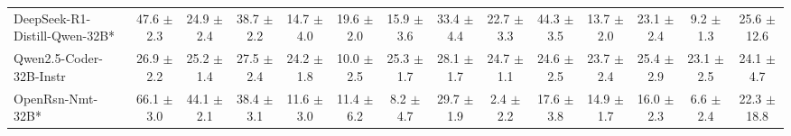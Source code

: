 \begin{table}[hbt]
{\begin{tabular}{l *{13}{c}}
DeepSeek-R1-Distill-Qwen-32B* &
47.6 {\tiny$\pm$ 2.3} &
24.9 {\tiny$\pm$ 2.4} &
38.7 {\tiny$\pm$ 2.2} &
14.7 {\tiny$\pm$ 4.0} &
19.6 {\tiny$\pm$ 2.0} &
15.9 {\tiny$\pm$ 3.6} &
33.4 {\tiny$\pm$ 4.4} &
22.7 {\tiny$\pm$ 3.3} &
44.3 {\tiny$\pm$ 3.5} &
13.7 {\tiny$\pm$ 2.0} &
23.1 {\tiny$\pm$ 2.4} &
9.2 {\tiny$\pm$ 1.3} &
25.6 {\tiny$\pm$ 12.6} \\


\rowcolor{gray!10}
Qwen2.5-Coder-32B-Instr &
26.9 {\tiny$\pm$ 2.2} &
25.2 {\tiny$\pm$ 1.4} &
27.5 {\tiny$\pm$ 2.4} &
24.2 {\tiny$\pm$ 1.8} &
10.0 {\tiny$\pm$ 2.5} &
25.3 {\tiny$\pm$ 1.7} &
28.1 {\tiny$\pm$ 1.7} &
24.7 {\tiny$\pm$ 1.1} &
24.6 {\tiny$\pm$ 2.5} &
23.7 {\tiny$\pm$ 2.4} &
25.4 {\tiny$\pm$ 2.9} &
23.1 {\tiny$\pm$ 2.5} &
24.1 {\tiny$\pm$ 4.7} \\





OpenRsn-Nmt-32B* &
66.1 {\tiny$\pm$ 3.0} &
44.1 {\tiny$\pm$ 2.1} &
38.4 {\tiny$\pm$ 3.1} &
11.6 {\tiny$\pm$ 3.0} &
11.4 {\tiny$\pm$ 6.2} &
8.2 {\tiny$\pm$ 4.7} &
29.7 {\tiny$\pm$ 1.9} &
2.4 {\tiny$\pm$ 2.2} &
17.6 {\tiny$\pm$ 3.8} &
14.9 {\tiny$\pm$ 1.7} &
16.0 {\tiny$\pm$ 2.3} &
6.6 {\tiny$\pm$ 2.4} &
22.3 {\tiny$\pm$ 18.8} \\



\end{tabular}}
\end{table}
